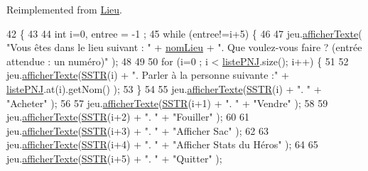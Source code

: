 Reimplemented from \hyperlink{class_lieu_ad5d4e14283df04f0174f090f1614225c}{Lieu}.


\begin{DoxyCode}
42                                                                       \{
43 
44         \textcolor{keywordtype}{int} i=0, entree = -1 ;
45     \textcolor{keywordflow}{while} (entree!=i+5) \{
46 
47         jeu.\hyperlink{class_jeu_aa09fb40439f16b9665a0d76679f78e4e}{afficherTexte}( \textcolor{stringliteral}{"Vous êtes dans le lieu suivant : "} + 
      \hyperlink{class_lieu_a1e48889fe5c581f043b8bd77ca497fc7}{nomLieu} + \textcolor{stringliteral}{". Que voulez-vous faire ? (entrée attendue : un numéro)"} );
48 
49 
50         \textcolor{keywordflow}{for} (i=0 ; i < \hyperlink{class_lieu_a8c1e20b105f7972f22d8f16651de4ebd}{listePNJ}.size(); i++) \{
51 
52         jeu.\hyperlink{class_jeu_aa09fb40439f16b9665a0d76679f78e4e}{afficherTexte}(\hyperlink{superette_8cpp_a0d2f37137ee1fd6ff4a0ef803849dd63}{SSTR}(i) + \textcolor{stringliteral}{". Parler à la personne suivante :"} + 
      \hyperlink{class_lieu_a8c1e20b105f7972f22d8f16651de4ebd}{listePNJ}.at(i).getNom() );
53         \}
54 
55         jeu.\hyperlink{class_jeu_aa09fb40439f16b9665a0d76679f78e4e}{afficherTexte}(\hyperlink{superette_8cpp_a0d2f37137ee1fd6ff4a0ef803849dd63}{SSTR}(i) + \textcolor{stringliteral}{". "} + \textcolor{stringliteral}{"Acheter"} );
56 
57         jeu.\hyperlink{class_jeu_aa09fb40439f16b9665a0d76679f78e4e}{afficherTexte}(\hyperlink{superette_8cpp_a0d2f37137ee1fd6ff4a0ef803849dd63}{SSTR}(i+1) + \textcolor{stringliteral}{". "} + \textcolor{stringliteral}{"Vendre"} );
58 
59         jeu.\hyperlink{class_jeu_aa09fb40439f16b9665a0d76679f78e4e}{afficherTexte}(\hyperlink{superette_8cpp_a0d2f37137ee1fd6ff4a0ef803849dd63}{SSTR}(i+2) + \textcolor{stringliteral}{". "} + \textcolor{stringliteral}{"Fouiller"} );
60 
61         jeu.\hyperlink{class_jeu_aa09fb40439f16b9665a0d76679f78e4e}{afficherTexte}(\hyperlink{superette_8cpp_a0d2f37137ee1fd6ff4a0ef803849dd63}{SSTR}(i+3) + \textcolor{stringliteral}{". "} + \textcolor{stringliteral}{"Afficher Sac"} );
62 
63         jeu.\hyperlink{class_jeu_aa09fb40439f16b9665a0d76679f78e4e}{afficherTexte}(\hyperlink{superette_8cpp_a0d2f37137ee1fd6ff4a0ef803849dd63}{SSTR}(i+4) + \textcolor{stringliteral}{". "} + \textcolor{stringliteral}{"Afficher Stats du Héros"} );
64 
65         jeu.\hyperlink{class_jeu_aa09fb40439f16b9665a0d76679f78e4e}{afficherTexte}(\hyperlink{superette_8cpp_a0d2f37137ee1fd6ff4a0ef803849dd63}{SSTR}(i+5) + \textcolor{stringliteral}{". "} + \textcolor{stringliteral}{"Quitter"} );

\end{DoxyCode}
